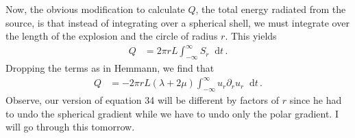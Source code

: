 \documentclass{article}
\newcommand*\diff{\mathop{}\!\mathrm{d}}
\begin{document}
Now, the obvious modification to calculate $Q$, the total energy radiated from the source, is that instead of integrating over a spherical shell, we must integrate over the length of the explosion and the circle of radius $r$. This yields
\begin{align}
Q&=2\pi rL\int_{-\infty}^{\infty}S_r\diff t\,.
\end{align}
Dropping the terms as in Hemmann, we find that
\begin{align}
Q&=-2\pi rL(\lambda+2\mu)\int_{-\infty}^{\infty}u_r\partial_r u_r\diff t\,.
\end{align}
Observe, our version of equation 34 will be different by factors of $r$ since he had to undo the spherical gradient while we have to undo only the polar gradient. I will go through this tomorrow.
\end{document}
